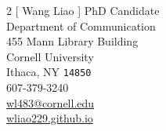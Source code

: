 \documentclass[11pt, letterpaper]{article} %
\begin{document}


\begin{multicols}{2}
[
{\LARGE Wang Liao} %
]
PhD Candidate\\
Department of Communication\\
455 Mann Library Building\\ %
Cornell University\\
Ithaca, NY \texttt{14850}\\

\columnbreak
{\tiny {}} 607-379-3240\\ %
{\tiny {}} \href{mailto:wl483@cornell.edu}{wl483@cornell.edu}\\ %
{\tiny {}} \href{https://wliao229.github.io}{wliao229.github.io}\\ %

\end{multicols}





\end{document}
